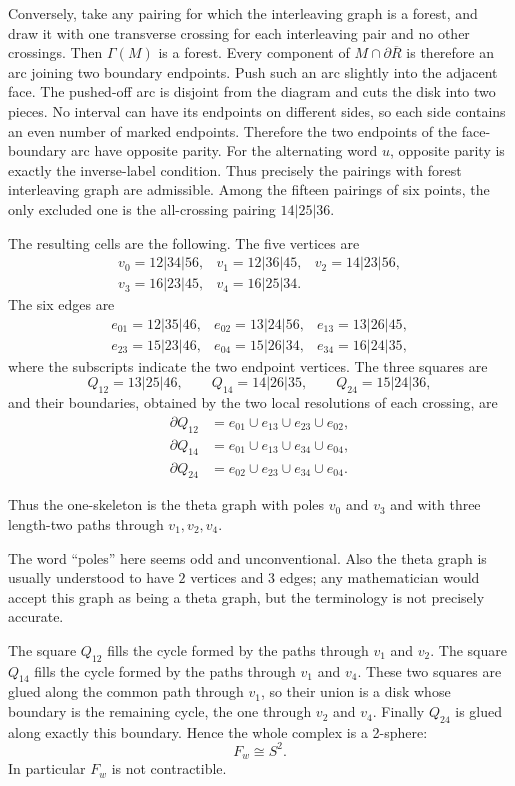 \documentclass[12pt]{article}
\newcommand{\review}[1]{\begin{reviewbox}#1\end{reviewbox}}
\begin{document}
Conversely, take any pairing for which the interleaving graph is a
forest, and draw it with one transverse crossing for each interleaving
pair and no other crossings.  Then \(\Gamma(M)\) is a forest.  Every
component of \(M\cap\partial\overline R\) is therefore an arc joining
two boundary endpoints.  Push such an arc slightly into the adjacent
face.  The pushed-off arc is disjoint from the diagram and cuts the disk
into two pieces.  No interval can have its endpoints on different sides,
so each side contains an even number of marked endpoints.  Therefore
the two endpoints of the face-boundary arc have opposite parity.  For
the alternating word \(u\), opposite parity is exactly the inverse-label
condition.  Thus precisely the pairings with forest interleaving graph
are admissible.  Among the fifteen pairings of six points, the only
excluded one is the all-crossing pairing \(14|25|36\).

The resulting cells are the following.  The five vertices are
\[
\begin{array}{lll}
v_0=12|34|56, & v_1=12|36|45, & v_2=14|23|56,\\
v_3=16|23|45, & v_4=16|25|34. &
\end{array}
\]
The six edges are
\[
\begin{array}{lll}
e_{01}=12|35|46, & e_{02}=13|24|56, & e_{13}=13|26|45,\\
e_{23}=15|23|46, & e_{04}=15|26|34, & e_{34}=16|24|35,
\end{array}
\]
where the subscripts indicate the two endpoint vertices.  The three
squares are
\[
        Q_{12}=13|25|46,\qquad
        Q_{14}=14|26|35,\qquad
        Q_{24}=15|24|36,
\]
and their boundaries, obtained by the two local resolutions of each
crossing, are
\[
\begin{aligned}
\partial Q_{12}&=e_{01}\cup e_{13}\cup e_{23}\cup e_{02},\\
\partial Q_{14}&=e_{01}\cup e_{13}\cup e_{34}\cup e_{04},\\
\partial Q_{24}&=e_{02}\cup e_{23}\cup e_{34}\cup e_{04}.
\end{aligned}
\]

Thus the one-skeleton is the theta graph with poles \(v_0\) and \(v_3\)
and with three length-two paths through \(v_1,v_2,v_4\).  
\review{The word ``poles'' here seems odd and unconventional. Also the theta graph is usually understood to have $2$ vertices and $3$ edges; any mathematician would accept this graph as being a theta graph, but the terminology is not precisely accurate.}
The square
\(Q_{12}\) fills the cycle formed by the paths through \(v_1\) and
\(v_2\).  The square \(Q_{14}\) fills the cycle formed by the paths
through \(v_1\) and \(v_4\).  These two squares are glued along the
common path through \(v_1\), so their union is a disk whose boundary is
the remaining cycle, the one through \(v_2\) and \(v_4\).  Finally
\(Q_{24}\) is glued along exactly this boundary.  Hence the whole
complex is a 2-sphere:
\[
        F_w \cong S^2 .
\]
In particular \(F_w\) is not contractible.
\end{document}
